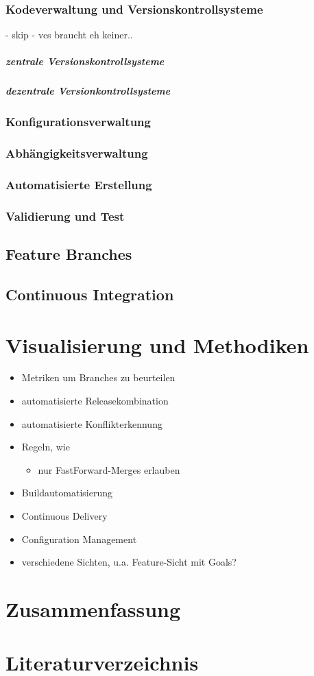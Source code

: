 \documentclass[10pt,a4paper]{book}
\begin{document}
\subsection{Kodeverwaltung und Versionskontrollsysteme}

- skip - vcs braucht eh keiner..

\paragraph{zentrale Versionskontrollsysteme}
\paragraph{dezentrale Versionkontrollsysteme}
\subsection{Konfigurationsverwaltung}
\subsection{Abhängigkeitsverwaltung}
\subsection{Automatisierte Erstellung}
\subsection{Validierung und Test}

\section{Feature Branches}

\section{Continuous Integration}

\chapter{Visualisierung und Methodiken}

\begin{itemize}
\item Metriken um Branches zu beurteilen
\item automatisierte Releasekombination
\item automatisierte Konflikterkennung
\item Regeln, wie 
	\begin{itemize}
		\item nur FastForward-Merges erlauben
	\end{itemize}	 
\item Buildautomatisierung
\item Continuous Delivery
\item Configuration Management
\item verschiedene Sichten, u.a. Feature-Sicht mit Goals?
\end{itemize}

\chapter{Zusammenfassung}


\chapter{Literaturverzeichnis}

\printbibliography
\end{document}
